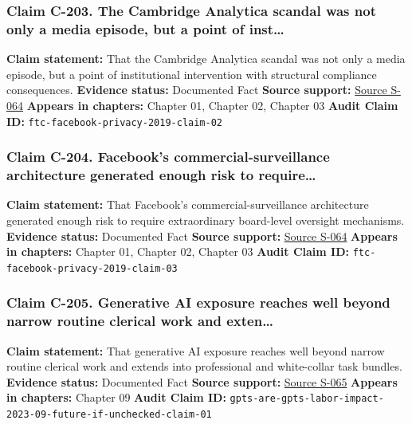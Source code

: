 \documentclass[
  american,
  11pt,
  letterpaper,
]{article}
\begin{document}
\subsubsection{Claim C-203. The Cambridge Analytica scandal was not only
a media episode, but a point of
inst\ldots{}}\label{claim-c-203-the-cambridge-analytica-scandal-was-not-only-a-media-episode-but-a-point-of-inst}

\textbf{Claim statement:} That the Cambridge Analytica scandal was not
only a media episode, but a point of institutional intervention with
structural compliance consequences. \textbf{Evidence status:} Documented
Fact \textbf{Source support:}
\hyperref[source-s-064-ftc-imposes-5-billion-penalty-and-sweeping-new-privacy-restrictions-on-facebook]{Source
S-064} \textbf{Appears in chapters:} Chapter 01, Chapter 02, Chapter 03
\textbf{Audit Claim ID:} \texttt{ftc-facebook-privacy-2019-claim-02}

\subsubsection{Claim C-204. Facebook's commercial-surveillance
architecture generated enough risk to
require\ldots{}}\label{claim-c-204-facebooks-commercial-surveillance-architecture-generated-enough-risk-to-require}

\textbf{Claim statement:} That Facebook's commercial-surveillance
architecture generated enough risk to require extraordinary board-level
oversight mechanisms. \textbf{Evidence status:} Documented Fact
\textbf{Source support:}
\hyperref[source-s-064-ftc-imposes-5-billion-penalty-and-sweeping-new-privacy-restrictions-on-facebook]{Source
S-064} \textbf{Appears in chapters:} Chapter 01, Chapter 02, Chapter 03
\textbf{Audit Claim ID:} \texttt{ftc-facebook-privacy-2019-claim-03}

\subsubsection{Claim C-205. Generative AI exposure reaches well beyond
narrow routine clerical work and
exten\ldots{}}\label{claim-c-205-generative-ai-exposure-reaches-well-beyond-narrow-routine-clerical-work-and-exten}

\textbf{Claim statement:} That generative AI exposure reaches well
beyond narrow routine clerical work and extends into professional and
white-collar task bundles. \textbf{Evidence status:} Documented Fact
\textbf{Source support:}
\hyperref[source-s-065-gpts-are-gpts-an-early-look-at-the-labor-market-impact-potential-of-large-language-models]{Source
S-065} \textbf{Appears in chapters:} Chapter 09 \textbf{Audit Claim ID:}
\texttt{gpts-are-gpts-labor-impact-2023-09-future-if-unchecked-claim-01}
\end{document}
